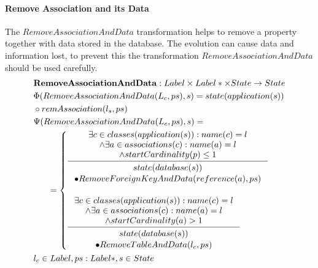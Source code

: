 \documentclass[11pt]{article}
\begin{document}
\paragraph{Remove Association and its Data} The $RemoveAssociationAndData$ transformation helps to remove a property together with data stored in the database. The evolution can cause data and information lost, to prevent this the transformation $RemoveAssociationAndData $ should be used carefully.
\begin{align*}
&	\mathbf{RemoveAssociationAndData} : Label \times Label* \times State \rightarrow State \\
&	\Phi(RemoveAssociationAndData(L_c, ps), s) = state(application(s))\\ 
& \circ remAssociation(l_s, ps) \\
&	\Psi(RemoveAssociationAndData(L_c, ps), s) = \\
& \;\;\;\;\;\; = \begin{cases}
 		\inference{\exists c \in classes(application(s)) : name(c) = l\\ 	\wedge \exists a \in associations(c) : name(a) = l \\ \wedge startCardinality(p) \leq 1}{\begin{gathered}
	state(database(s)) \\ \bullet RemoveForeignKeyAndData(reference(a), ps)
\end{gathered}}
 		\\\\
 	\inference{\exists c \in classes(application(s)) : name(c) = l\\ 	\wedge \exists a \in associations(c) : name(a) = l \\ \wedge startCardinality(a) > 1}{\begin{gathered}
	state(database(s)) \\\bullet RemoveTableAndData(l_c, ps)
\end{gathered}}
 \end{cases}
	\\
&	l_c \in Label, ps : Label*, s \in State
\end{align*}
\end{document}
